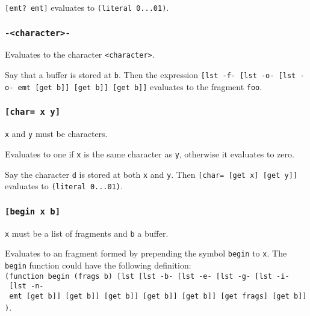 \documentclass[]{article}
\begin{document}
\texttt{{[}emt?\ emt{]}} evaluates to \texttt{(literal\ 0...01)}.

\hypertarget{-ux5ctextlessux7bux7dcharacterux5ctextgreaterux7bux7d-}{%
\subsubsection{\texorpdfstring{\texttt{-\textless{}character\textgreater{}-}}{-\textless{}character\textgreater{}-}}\label{-ux5ctextlessux7bux7dcharacterux5ctextgreaterux7bux7d-}}

Evaluates to the character \texttt{\textless{}character\textgreater{}}.

Say that a buffer is stored at \texttt{b}. Then the expression
\texttt{{[}lst\ -f-\ {[}lst\ -o-\ {[}lst\ -o-\ emt\ {[}get\ b{]}{]}\ {[}get\ b{]}{]}\ {[}get\ b{]}{]}}
evaluates to the fragment \texttt{foo}.

\hypertarget{ux7bux5bux7dchar=-x-yux7bux5dux7d}{%
\subsubsection{\texorpdfstring{\texttt{{[}char=\ x\ y{]}}}{{[}char= x y{]}}}\label{ux7bux5bux7dchar=-x-yux7bux5dux7d}}

\texttt{x} and \texttt{y} must be characters.

Evaluates to one if \texttt{x} is the same character as \texttt{y},
otherwise it evaluates to zero.

Say the character \texttt{d} is stored at both \texttt{x} and
\texttt{y}. Then \texttt{{[}char=\ {[}get\ x{]}\ {[}get\ y{]}{]}}
evaluates to \texttt{(literal\ 0...01)}.

\hypertarget{ux7bux5bux7dbegin-x-bux7bux5dux7d}{%
\subsubsection{\texorpdfstring{\texttt{{[}begin\ x\ b{]}}}{{[}begin x b{]}}}\label{ux7bux5bux7dbegin-x-bux7bux5dux7d}}

\texttt{x} must be a list of fragments and \texttt{b} a buffer.

Evaluates to an fragment formed by prepending the symbol \texttt{begin}
to \texttt{x}. The \texttt{begin} function could have the following
definition:
\texttt{(function\ begin\ (frags\ b)\ {[}lst\ {[}lst\ -b-\ {[}lst\ -e-\ {[}lst\ -g-\ {[}lst\ -i-\ {[}lst\ -n-\ emt\ {[}get\ b{]}{]}\ {[}get\ b{]}{]}\ {[}get\ b{]}{]}\ {[}get\ b{]}{]}\ {[}get\ b{]}{]}\ {[}get\ frags{]}\ {[}get\ b{]}{]})}.
\end{document}
